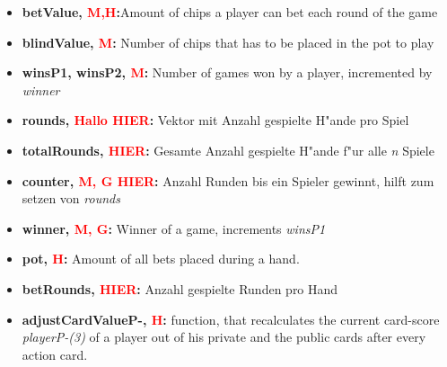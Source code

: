 \documentclass[11pt]{article}
\begin{document}
\begin{itemize}
\item	\textbf{betValue, \textcolor{red}{M,H}:}Amount of chips a player can bet each round of the game\\


\item	\textbf{blindValue, \textcolor{red}{M}:} Number of chips that has to be placed in the pot to play\\


\item	\textbf{winsP1, winsP2, \textcolor{red}{M}:} Number of games won by a player, incremented by \emph{winner}\\
\item	\textbf{rounds, \textcolor{red}{Hallo HIER}:} Vektor mit Anzahl gespielte H"ande pro Spiel\\

\item	\textbf{totalRounds, \textcolor{red}{HIER}:} Gesamte Anzahl gespielte H"ande f"ur alle \emph{n} Spiele\\	

\item	\textbf{counter, \textcolor{red}{M, G HIER}:} Anzahl Runden bis ein Spieler gewinnt, hilft zum setzen von \emph{rounds} \\

\item	\textbf{winner, \textcolor{red}{M, G}:} Winner of a game, increments \emph{winsP1} \\

\item	\textbf{pot, \textcolor{red}{H}:} Amount of all bets placed during a hand. %
\\

\item	\textbf{betRounds, \textcolor{red}{HIER}:} Anzahl gespielte Runden pro Hand \\

\item	\textbf{adjustCardValueP-, \textcolor{red}{H}:}
function, that recalculates the current card-score \emph{playerP-(3)} of a player out of his private and the public cards after every action card.\\



\end{itemize}
\end{document}
